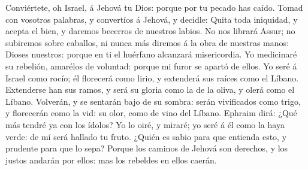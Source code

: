  Conviértete, oh Israel, á Jehová tu Dios: porque por tu
pecado has caído.  Tomad con vosotros palabras, y convertíos
á Jehová, y decidle: Quita toda iniquidad, y acepta el bien, y daremos
becerros de nuestros labios.  No nos librará Assur; no
subiremos sobre caballos, ni nunca más diremos á la obra de nuestras
manos: Dioses nuestros: porque en ti el huérfano alcanzará misericordia.
 Yo medicinaré su rebelión, amarélos de voluntad: porque mi
furor se apartó de ellos.  Yo seré á Israel como rocío; él
florecerá como lirio, y extenderá sus raíces como el Líbano.
 Extenderse han sus ramos, y será su gloria como la de la
oliva, y olerá como el Líbano.  Volverán, y se sentarán bajo
de su sombra: serán vivificados como trigo, y florecerán como la vid: su
olor, como de vino del Líbano.  Ephraim dirá: ¿Qué más
tendré ya con los ídolos? Yo lo oiré, y miraré; yo seré á él como la
haya verde: de mí será hallado tu fruto.  ¿Quién es sabio
para que entienda esto, y prudente para que lo sepa? Porque los caminos
de Jehová son derechos, y los justos andarán por ellos: mas los rebeldes
en ellos caerán.
